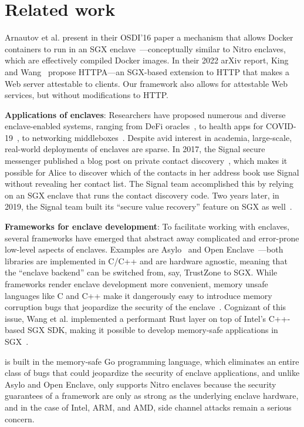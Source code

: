 \section{Related work}%
\label{sec:related-work}

Arnautov et al. present in their OSDI'16 paper a mechanism that allows Docker
containers to run in an SGX enclave~\cite{Arnautov2016a}---conceptually similar
to Nitro enclaves, which are effectively compiled Docker images.
%
In their 2022 arXiv report, King and Wang~\cite{King2022a} propose HTTPA---an
SGX-based extension to HTTP that makes a Web server attestable to clients.  Our
framework also allows for attestable Web services, but without modifications to
HTTP.

\textbf{Applications of enclaves}:
Researchers have proposed numerous and diverse enclave-enabled systems, ranging
from DeFi oracles~\cite{Zhang16a}, to health apps for
COVID-19~\cite{Mailthody21a}, to networking middleboxes~\cite{Han17a}.  Despite
avid interest in academia, large-scale, real-world deployments of enclaves are
sparse.  In 2017, the Signal secure messenger published a blog post on private
contact discovery~\cite{Marlinspike17a}, which makes it possible for Alice to
discover which of the contacts in her address book use Signal without revealing
her contact list.  The Signal team accomplished this by relying on an SGX
enclave that runs the contact discovery code.  Two years later, in 2019, the
Signal team built its ``secure value recovery'' feature on SGX as
well~\cite{Lund19a}.

\textbf{Frameworks for enclave development}:
To facilitate working with enclaves, several frameworks have emerged that
abstract away complicated and error-prone low-level aspects of enclaves.
Examples are Asylo~\cite{asylo} and Open Enclave~\cite{openenclave}---both
libraries are implemented in C/C++ and are hardware agnostic, meaning that the
``enclave backend'' can be switched from, say, TrustZone to SGX.  While
frameworks render enclave development more convenient, memory unsafe languages
like C and C++ make it dangerously easy to introduce memory corruption bugs
that jeopardize the security of the enclave~\cite{Lee2017a}.  Cognizant of
this issue, Wang et al. implemented a performant Rust layer on top of Intel's
C++-based SGX SDK, making it possible to develop memory-safe applications in
SGX~\cite{Wang2019a}.

\Tool{} is built in the memory-safe Go programming language, which
eliminates an entire class of bugs that could jeopardize the security of
enclave applications, and unlike Asylo and Open Enclave, \tool{} only
supports Nitro enclaves because the security guarantees of a framework are only
as strong as the underlying enclave hardware, and in the case of Intel, ARM,
and AMD, side channel attacks remain a serious concern.

